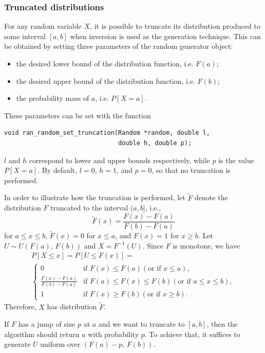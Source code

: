 \subsubsection{Truncated distributions}

For any random variable $X$, it is possible to truncate its
distribution produced to some interval $[a,b]$ when inversion is used
as the generation technique.
This can be obtained by setting three parameters of the random
generator object:
\begin{itemize}
\item
the desired lower bound of the distribution function, i.e. $F(a)$;
\item
the desired upper bound of the distribution function, i.e. $F(b)$;
\item
the probability mass of $a$, i.e. $P[X=a]$.
\end{itemize}
These parameters can be set with the function
\begin{verbatim}
void ran_random_set_truncation(Random *random, double l,
                               double h, double p);
\end{verbatim}
$l$ and $h$ correspond to lower and upper bounds respectively, while
$p$ is the value $P[X=a]$.
By default, $l = 0$, $h = 1$, and $p = 0$, so that no truncation is performed.

In order to illustrate how the truncation is performed, let
$\tilde{F}$ denote the distribution $F$ truncated to the interval
$(a,b]$, i.e.,
\[
 \tilde{F}(x) = \frac{F(x)-F(a)}{F(b)-F(a)}
\]
for $a \le x\le b$, $\tilde F(x) = 0$ for $x \le a$, and $F(x) = 1$
for $x\ge b$.
Let $U \sim U(F(a),\, F(b))$ and $X=F^{-1}(U)$.
Since $F$ is monotone, we have
\begin{multline*}
P[X\leq x] = P[U\leq F(x)] =\\
\begin{cases}
  0 & \mbox{if } F(x)\le F(a) (\mbox{or if } x \le a), \\
  \frac{F(x)-F(a)}{F(b)-F(a)} & \mbox{if } F(a) \le F(x) \leq F(b)
  (\mbox{or if } a \le x\leq b), \\
  1 & \mbox{if } F(x) \ge F(b)  (\mbox{or if } x \ge b).
\end{cases}
\end{multline*}
Therefore, $X$ has distribution $\tilde{F}$.

If $F$ has a jump of size $p$ at $a$ and we want to truncate to
$[a,b]$, then the algorithm should return $a$ with probability $p$.
To achieve that, it suffices to generate $U$ uniform over $(F(a)-p,\,
F(b))$.

